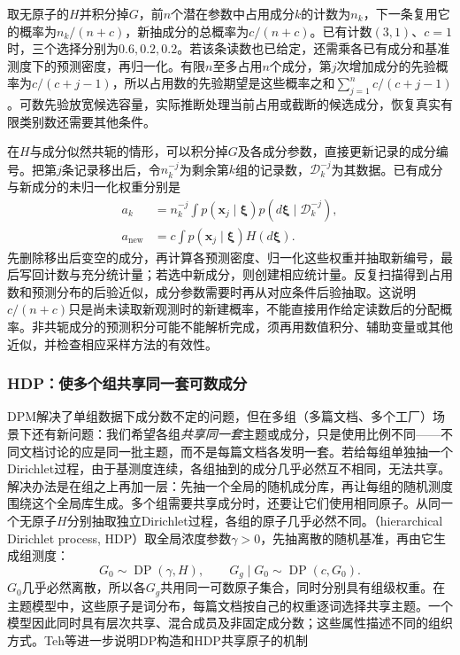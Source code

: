 取无原子的$H$并积分掉$G$，前$n$个潜在参数中占用成分$k$的计数为$n_k$，下一条复用它的概率为$n_k/(n+c)$，新抽成分的总概率为$c/(n+c)$。已有计数$(3,1)$、$c=1$时，三个选择分别为$0.6,0.2,0.2$。若该条读数也已给定，还需乘各已有成分和基准测度下的预测密度，再归一化。有限$n$至多占用$n$个成分，第$j$次增加成分的先验概率为$c/(c+j-1)$，所以占用数的先验期望是这些概率之和$\sum_{j=1}^n c/(c+j-1)$。可数先验放宽候选容量，实际推断处理当前占用或截断的候选成分，恢复真实有限类别数还需要其他条件。

在$H$与成分似然共轭的情形，可以积分掉$G$及各成分参数，直接更新记录的成分编号。把第$j$条记录移出后，令$n_k^{-j}$为剩余第$k$组的记录数，$\mathcal D_k^{-j}$为其数据。已有成分与新成分的未归一化权重分别是
\begin{equation}
 \begin{aligned}
 a_k&=n_k^{-j}\int p(\bm x_j\mid\bm\xi)
                              p(d\bm\xi\mid\mathcal D_k^{-j}),\\
 a_{\mathrm{new}}&=c\int p(\bm x_j\mid\bm\xi)H(d\bm\xi).
 \end{aligned}
 \label{eq:pgm-static-directed-dpm-allocation}
\end{equation}
先删除移出后变空的成分，再计算各预测密度、归一化这些权重并抽取新编号，最后写回计数与充分统计量；若选中新成分，则创建相应统计量。反复扫描得到占用数和预测分布的后验近似，成分参数需要时再从对应条件后验抽取。这说明$c/(n+c)$只是尚未读取新观测时的新建概率，不能直接用作给定读数后的分配概率。非共轭成分的预测积分可能不能解析完成，须再用数值积分、辅助变量或其他近似，并检查相应采样方法的有效性。

\subsubsection{HDP：使多个组共享同一套可数成分}
\label{sec:pgm-static-directed-hdp-model}

DPM解决了单组数据下成分数不定的问题，但在多组（多篇文档、多个工厂）场景下还有新问题：我们希望各组\emph{共享同一套}主题或成分，只是使用比例不同——不同文档讨论的应是同一批主题，而不是每篇文档各发明一套。若给每组单独抽一个Dirichlet过程，由于基测度连续，各组抽到的成分几乎必然互不相同，无法共享。解决办法是在组之上再加一层：先抽一个全局的随机成分库，再让每组的随机测度围绕这个全局库生成。多个组需要共享成分时，还要让它们使用相同原子。从同一个无原子$H$分别抽取独立Dirichlet过程，各组的原子几乎必然不同。（hierarchical Dirichlet process, HDP）取全局浓度参数$\gamma>0$，先抽离散的随机基准，再由它生成组测度：
\begin{equation}
  \label{eq:pgm-static-directed-hdp}
  G_0\sim\operatorname{DP}(\gamma,H),\qquad
  G_g\mid G_0\sim\operatorname{DP}(c,G_0).
\end{equation}
$G_0$几乎必然离散，所以各$G_g$共用同一可数原子集合，同时分别具有组级权重。在主题模型中，这些原子是词分布，每篇文档按自己的权重逐词选择共享主题。一个模型因此同时具有层次共享、混合成员及非固定成分数；这些属性描述不同的组织方式。Teh等进一步说明DP构造和HDP共享原子的机制

